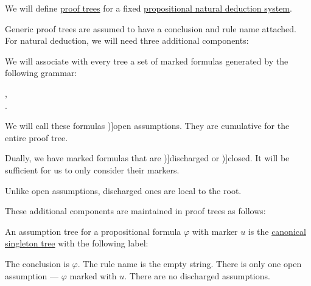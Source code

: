 \begin{definition}\label{def:propositional_natural_deduction_proof_tree}\mimprovised
  We will define \hyperref[def:proof_tree]{proof trees} for a fixed \hyperref[def:propositional_natural_deduction_system]{propositional natural deduction system}.

  Generic proof trees are assumed to have a conclusion and rule name attached. For natural deduction, we will need three additional components:
  \begin{thmenum}[series=def:propositional_natural_deduction_proof_tree]
     We will associate with every tree a set of marked formulas generated by the following grammar:
    \begin{bnf*}
                {}, \\
        { \bnfsp \bnftsq{:} \bnfsp {}}.
    \end{bnf*}

    We will call these formulas \term[en=open assumption (\cite[24]{TroelstraSchwichtenberg2000BasicProofTheory})]{open assumptions}. They are cumulative for the entire proof tree.

     Dually, we have marked formulas that are \term[en=discharged (\cite[9]{GirardEtAl1989ProofsAndTypes})]{discharged} or \term[en=closed (\cite[23]{TroelstraSchwichtenberg2000BasicProofTheory})]{closed}. It will be sufficient for us to only consider their markers.

    Unlike open assumptions, discharged ones are local to the root.
  \end{thmenum}

  These additional components are maintained in proof trees as follows:
  \begin{thmenum}[resume=def:propositional_natural_deduction_proof_tree]
     An assumption tree for a propositional formula \( \varphi \) with marker \( u \) is the \hyperref[def:canonical_singleton_tree]{canonical singleton tree} with the following label:
    \begin{thmenum}
       The conclusion is \( \varphi \).
       The rule name is the empty string.
       There is only one open assumption --- \( \varphi \) marked with \( u \).
       There are no discharged assumptions.
    \end{thmenum}


\end{thmenum}
\end{definition}
